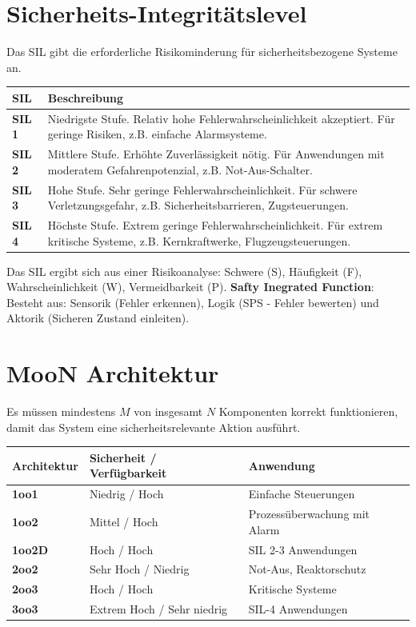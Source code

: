 \documentclass[8pt, landscape]{article}
\newcommand{\algo}[1]{\textbf{\textcolor{blue!60!black}{#1}}}
\begin{document}
\begin{multicols*}{4}
\begin{itemize}
\end{itemize}

\section{Sicherheits-Integritätslevel}
Das SIL gibt die erforderliche Risikominderung für sicherheitsbezogene Systeme an.

\noindent
\begin{tabularx}{\linewidth}{l >{\RaggedRight}X}
\toprule
\textbf{SIL} & \textbf{Beschreibung}  \\
\midrule
\textbf{SIL 1} & Niedrigste Stufe. Relativ hohe Fehlerwahrscheinlichkeit akzeptiert. Für geringe Risiken, z.B. einfache Alarmsysteme. \\
\textbf{SIL 2} & Mittlere Stufe. Erhöhte Zuverlässigkeit nötig. Für Anwendungen mit moderatem Gefahrenpotenzial, z.B. Not-Aus-Schalter. \\
\textbf{SIL 3} & Hohe Stufe. Sehr geringe Fehlerwahrscheinlichkeit. Für schwere Verletzungsgefahr, z.B. Sicherheitsbarrieren, Zugsteuerungen. \\
\textbf{SIL 4} & Höchste Stufe. Extrem geringe Fehlerwahrscheinlichkeit. Für extrem kritische Systeme, z.B. Kernkraftwerke, Flugzeugsteuerungen. \\
\bottomrule
\end{tabularx}

Das SIL ergibt sich aus einer Risikoanalyse: Schwere (S), Häufigkeit (F), Wahrscheinlichkeit (W), Vermeidbarkeit (P).
\algo{Safty Inegrated Function}: Besteht aus: Sensorik (Fehler erkennen), Logik (SPS - Fehler bewerten) und Aktorik (Sicheren Zustand einleiten).

\section{MooN Architektur}
Es müssen mindestens $M$ von insgesamt $N$ Komponenten korrekt funktionieren, damit das System eine
sicherheitsrelevante Aktion ausführt. 

\noindent
\begingroup
\setlength{\tabcolsep}{4pt}
\renewcommand{\cellalign}{l} %
\begin{tabularx}{\linewidth}{l >{\RaggedRight}X  >{\RaggedRight}X}
\toprule
\textbf{Architektur} &  \textbf{Sicherheit / Verfügbarkeit} & \textbf{Anwendung} \\
\midrule
\textbf{1oo1} &  Niedrig / Hoch & Einfache Steuerungen \\
\textbf{1oo2} & Mittel / Hoch & Prozessüberwachung mit Alarm \\ %
\textbf{1oo2D} & Hoch / Hoch & SIL 2-3 Anwendungen \\
\textbf{2oo2} & Sehr Hoch / Niedrig & Not-Aus, Reaktorschutz \\
\textbf{2oo3} & Hoch / Hoch & Kritische Systeme \\
\textbf{3oo3} & Extrem Hoch / Sehr niedrig & SIL-4 Anwendungen \\


\end{tabularx}
\end{multicols*}
\end{document}
